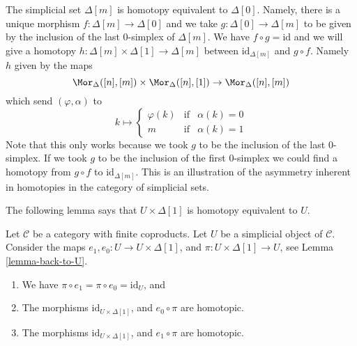 \begin{example}
\label{example-simplex-contractible}
The simplicial set $\Delta[m]$ is homotopy equivalent to $\Delta[0]$.
Namely, there is a unique morphism $f : \Delta[m] \to \Delta[0]$ and
we take $g : \Delta[0] \to \Delta[m]$ to be
given by the inclusion of the last $0$-simplex of $\Delta[m]$.
We have $f \circ g = \text{id}$ and we will give a
homotopy $h : \Delta[m] \times \Delta[1] \to \Delta[m]$
between $\text{id}_{\Delta[m]}$ and $g \circ f$. Namely $h$ given by
the maps
$$
\Mor_\Delta([n], [m]) \times \Mor_\Delta([n], [1]) \to \Mor_\Delta([n], [m])
$$
which send $(\varphi, \alpha)$ to
$$
k \mapsto
\left\{
\begin{matrix}
\varphi(k) & \text{if} & \alpha(k) = 0 \\
m & \text{if} & \alpha(k) = 1
\end{matrix}
\right.
$$
Note that this only works because we took $g$ to be the inclusion of the
last $0$-simplex. If we took $g$ to be the inclusion of the first $0$-simplex
we could find a homotopy from $g \circ f$ to $\text{id}_{\Delta[m]}$.
This is an illustration of the asymmetry inherent in homotopies in the
category of simplicial sets.
\end{example}


\noindent
The following lemma says that $U \times \Delta[1]$
is homotopy equivalent to $U$.

\begin{lemma}
\label{lemma-contractible}
Let $\mathcal{C}$ be a category with finite coproducts.
Let $U$ be a simplicial object of $\mathcal{C}$.
Consider the maps $e_1, e_0 : U \to U \times \Delta[1]$,
and $\pi : U \times \Delta[1] \to U$, see
Lemma \ref{lemma-back-to-U}.
\begin{enumerate}
\item We have $\pi \circ e_1 = \pi \circ e_0 = \text{id}_U$, and
\item The morphisms $\text{id}_{U \times \Delta[1]}$,
and $e_0 \circ \pi$ are homotopic.
\item The morphisms $\text{id}_{U \times \Delta[1]}$,
and $e_1 \circ \pi$ are homotopic.
\end{enumerate}
\end{lemma}

